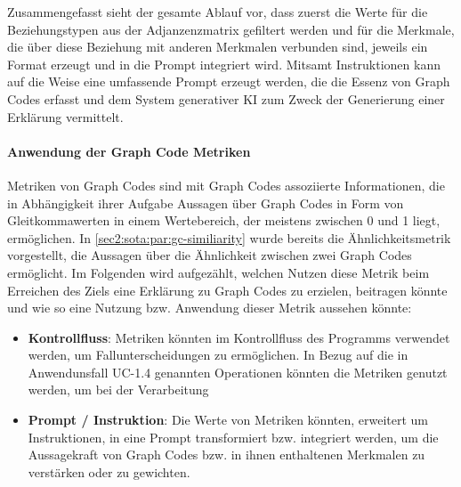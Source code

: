 Zusammengefasst sieht der gesamte Ablauf vor, dass zuerst die Werte für die Beziehungstypen aus der Adjanzenzmatrix gefiltert werden und für die Merkmale, die über diese Beziehung mit anderen Merkmalen verbunden sind, jeweils ein Format erzeugt und in die Prompt integriert wird.
Mitsamt Instruktionen kann auf die Weise eine umfassende Prompt erzeugt werden, die die Essenz von Graph Codes erfasst und dem System generativer KI zum Zweck der Generierung einer Erklärung vermittelt.



\paragraph{Anwendung der Graph Code Metriken}
Metriken von Graph Codes sind mit Graph Codes assoziierte Informationen, die in Abhängigkeit ihrer Aufgabe Aussagen über Graph Codes in Form von Gleitkommawerten in einem Wertebereich, der meistens zwischen 0 und 1 liegt, ermöglichen. In \cref{sec2:sota:par:gc-similiarity} wurde bereits die Ähnlichkeitsmetrik vorgestellt, die Aussagen über die Ähnlichkeit zwischen zwei Graph Codes ermöglicht.
Im Folgenden wird aufgezählt, welchen Nutzen diese Metrik beim Erreichen des Ziels eine Erklärung zu Graph Codes zu erzielen, beitragen könnte und wie so eine Nutzung bzw. Anwendung dieser Metrik aussehen könnte:
\begin{itemize}
    \item \textbf{Kontrollfluss}: Metriken könnten im Kontrollfluss des Programms verwendet werden, um Fallunterscheidungen zu ermöglichen.
    In Bezug auf die in Anwendunsfall UC-1.4 genannten Operationen könnten die Metriken genutzt werden, um bei der Verarbeitung
    \item \textbf{Prompt / Instruktion}: Die Werte von Metriken könnten, erweitert um Instruktionen, in eine Prompt transformiert bzw. integriert werden, um die Aussagekraft von Graph Codes bzw. in ihnen enthaltenen Merkmalen zu verstärken oder zu gewichten.
\end{itemize}


